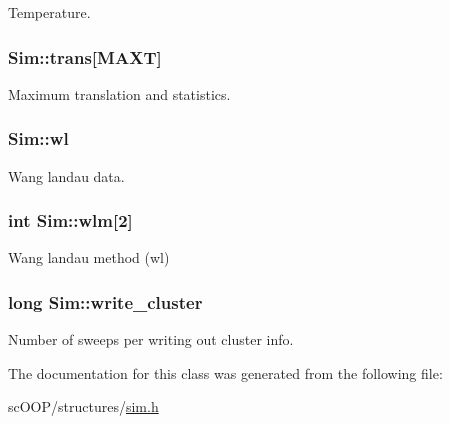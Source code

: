 Temperature. 

\hypertarget{class_sim_a72db680d42b459fad8362d37914ae9a8}{
\subsubsection[{trans}]{ Sim\+::trans\mbox{[}{\bf M\+A\+X\+T}\mbox{]}}}\label{class_sim_a72db680d42b459fad8362d37914ae9a8}


Maximum translation and statistics. 

\hypertarget{class_sim_ade98939300538c5d79e144d8c583b258}{
\subsubsection[{wl}]{ Sim\+::wl}}\label{class_sim_ade98939300538c5d79e144d8c583b258}


Wang landau data. 

\hypertarget{class_sim_a43570c2d1a73631e8c00f5512a8486b6}{
\subsubsection[{wlm}]{\setlength{\rightskip}{0pt plus 5cm}int Sim\+::wlm\mbox{[}2\mbox{]}}}\label{class_sim_a43570c2d1a73631e8c00f5512a8486b6}


Wang landau method (wl) 

\hypertarget{class_sim_ae3f308ef99bae8099bb581b89618ba09}{
\subsubsection[{write\+\_\+cluster}]{\setlength{\rightskip}{0pt plus 5cm}long Sim\+::write\+\_\+cluster}}\label{class_sim_ae3f308ef99bae8099bb581b89618ba09}


Number of sweeps per writing out cluster info. 



The documentation for this class was generated from the following file\+:\begin{DoxyCompactItemize}
\item 
sc\+O\+O\+P/structures/\hyperlink{sim_8h}{sim.\+h}\end{DoxyCompactItemize}
